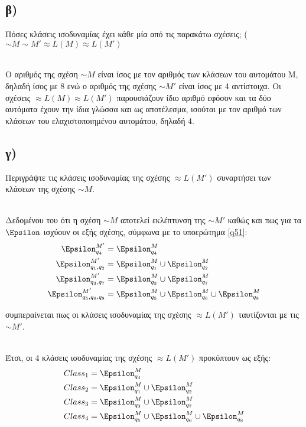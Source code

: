 \noindent
\subsection[Ερώτημα β]{\textbf{β) }} Πόσες κλάσεις ισοδυναμίας έχει κάθε μία από τις παρακάτω σχέσεις; ($\sim M \sim M' \approx L(M) \approx L(M')$

\noindent\\
Ο αριθμός της σχέση $\sim M$ είναι ίσος με τον αριθμός των κλάσεων του αυτομάτου Μ, δηλαδή ίσος με 8 ενώ ο αριθμός της σχέσης $\sim M'$ είναι ίσος με 4 αντίστοιχα. Οι σχέσεις $\approx L(M ) \approx L(M')$ παρουσιάζουν ίδιο αριθμό εφόσον και τα δύο αυτόματα έχουν την ίδια γλώσσα και ως αποτέλεσμα, ισούται με τον αριθμό των κλάσεων του ελαχιστοποιημένου αυτομάτου, δηλαδή 4.

\subsection[Ερώτημα γ]{\textbf{γ) }} Περιγράψτε τις κλάσεις ισοδυναμίας της σχέσης $\approx L(M')$ συναρτήσει των κλάσεων της σχέσης $\sim M$.

\noindent\\
Δεδομένου του ότι η σχέση $\sim M$ αποτελεί εκλέπτυνση της $\sim M'$ καθώς και πως για τα $\Epsilon$ ισχύουν οι εξής σχέσης, σύμφωνα με το υποερώτημα \ref{q51}:
\begin{align*}
	\Epsilon_{q_4}^{M'} &= \Epsilon_{q_4}^{M}\\
	\Epsilon_{q_1, q_2}^{M'} &= \Epsilon_{q_1}^{M} \cup \Epsilon_{q_2}^{M}\\
	\Epsilon_{q_3, q_7}^{M'} &= \Epsilon_{q_3}^{M} \cup \Epsilon_{q_7}^{M}\\
	\Epsilon_{q_5, q_6, q_8}^{M'} &= \Epsilon_{q_5}^{M} \cup \Epsilon_{q_6}^{M} \cup \Epsilon_{q_8}^{M}\\
\end{align*}

συμπεραίνεται πως οι κλάσεις ισοδυναμίας της σχέσης $\approx L(M')$ ταυτίζονται με τις $\sim M'$.

\noindent\\
Έτσι, οι 4 κλάσεις ισοδυναμίας της σχέσης $\approx L(M')$ προκύπτουν ως εξής:
\begin{align}
	Class_1 &= \Epsilon_{q_4}^{M}\\
	Class_2 &= \Epsilon_{q_1}^{M} \cup \Epsilon_{q_2}^{M}\\
	Class_3 &= \Epsilon_{q_3}^{M} \cup \Epsilon_{q_7}^{M}\\
	Class_4 &= \Epsilon_{q_5}^{M} \cup \Epsilon_{q_6}^{M} \cup \Epsilon_{q_8}^{M}\\
\end{align}